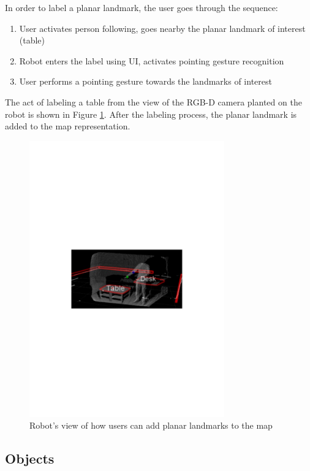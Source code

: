 In order to label a planar landmark, the user goes through the sequence:

\begin{enumerate}
\item User activates person following, goes nearby the planar landmark of interest (table)
\item Robot enters the label using UI, activates pointing gesture recognition
\item User performs a pointing gesture towards the landmarks of interest
\end{enumerate}

The act of labeling a table from the view of the RGB-D camera planted on the robot is shown in Figure \ref{fig:pointing_table_desk}. After the labeling process, the planar landmark is added to the map representation.

\begin{figure}[ht!]
\centering
\includegraphics[width=0.75\textwidth]{pics/pointing_table_desk}
\caption{Robot's view of how users can add planar landmarks to the map}
\label{fig:pointing_table_desk}
\end{figure}

\subsection{Objects}
\label{sec:map_objects}

